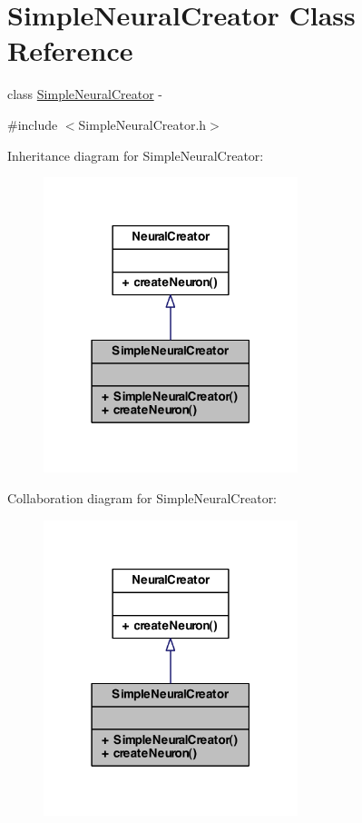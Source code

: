 \hypertarget{class_simple_neural_creator}{
\section{SimpleNeuralCreator Class Reference}
\label{class_simple_neural_creator}
}


class \hyperlink{class_simple_neural_creator}{SimpleNeuralCreator} -\/  




{\ttfamily \#include $<$SimpleNeuralCreator.h$>$}



Inheritance diagram for SimpleNeuralCreator:\nopagebreak
\begin{figure}[H]
\begin{center}
\leavevmode
\includegraphics[width=210pt]{class_simple_neural_creator__inherit__graph}
\end{center}
\end{figure}


Collaboration diagram for SimpleNeuralCreator:\nopagebreak
\begin{figure}[H]
\begin{center}
\leavevmode
\includegraphics[width=210pt]{class_simple_neural_creator__coll__graph}
\end{center}
\end{figure}
